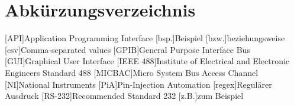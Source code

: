 \section*{Abkürzungsverzeichnis}
\begin{acronym}[MICBAC]
[API]{Application Programming Interface}
[bsp.]{Beispiel}
[bzw.]{beziehungsweise}
[csv]{Comma-separated values}
[GPIB]{General Purpose Interface Bus}
[GUI]{Graphical User Interface}
[IEEE 488]{Institute of Electrical and Electronic Engineers Standard 488}
[MICBAC]{Micro System Bus Access Channel}
[NI]{National Instruments}
[PiA]{Pin-Injection Automation}
[regex]{Regulärer Ausdruck}
[RS-232]{Recommended Standard 232}
[z.B.]{zum Beispiel}
\end{acronym}
